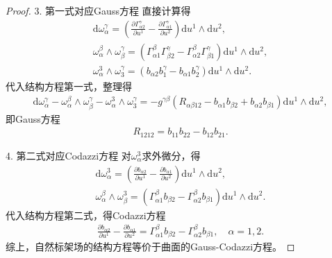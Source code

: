 \documentclass[../../main.tex]{subfiles}%
\begin{document}
\begin{proof}
3. 第一式对应Gauss方程
直接计算得
\begin{gather*}
\mathrm{d}\omega^\gamma_\alpha=\left(\frac{\partial\Gamma^\gamma_{\alpha2}}{\partial u^1}-\frac{\partial\Gamma^\gamma_{\alpha1}}{\partial u^2}\right)\mathrm{d}u^1\wedge\mathrm{d}u^2,\\
\omega^\beta_\alpha\wedge\omega^\gamma_\beta=\left(\Gamma^\beta_{\alpha1}\Gamma^\gamma_{\beta2}-\Gamma^\beta_{\alpha2}\Gamma^\gamma_{\beta1}\right)\mathrm{d}u^1\wedge\mathrm{d}u^2,\\
\omega^3_\alpha\wedge\omega^\gamma_3=(b_{\alpha2}b_1^\gamma-b_{\alpha1}b_2^\gamma)\mathrm{d}u^1\wedge\mathrm{d}u^2.
\end{gather*}
代入结构方程第一式，整理得
\begin{align*}
\mathrm{d}\omega^\gamma_\alpha-\omega^\beta_\alpha\wedge\omega^\gamma_\beta-\omega^3_\alpha\wedge\omega^\gamma_3=-g^{\gamma\beta}\left(R_{\alpha\beta12}-b_{\alpha1}b_{\beta2}+b_{\alpha2}b_{\beta1}\right)\mathrm{d}u^1\wedge\mathrm{d}u^2,
\end{align*}
即Gauss方程
\begin{align}
R_{1212}=b_{11}b_{22}-b_{12}b_{21}.
\label{eq:gauss-equation}
\end{align}

4. 第二式对应Codazzi方程
对$\omega^3_\alpha$求外微分，得
\begin{align*}
\mathrm{d}\omega^3_\alpha=\left(\frac{\partial b_{\alpha2}}{\partial u^1}-\frac{\partial b_{\alpha1}}{\partial u^2}\right)\mathrm{d}u^1\wedge\mathrm{d}u^2,\\
\omega^\beta_\alpha\wedge\omega^3_\beta=\left(\Gamma^\beta_{\alpha1}b_{\beta2}-\Gamma^\beta_{\alpha2}b_{\beta1}\right)\mathrm{d}u^1\wedge\mathrm{d}u^2.
\end{align*}
代入结构方程第二式，得Codazzi方程
\begin{align}
\frac{\partial b_{\alpha2}}{\partial u^1}-\frac{\partial b_{\alpha1}}{\partial u^2}=\Gamma^\beta_{\alpha1}b_{\beta2}-\Gamma^\beta_{\alpha2}b_{\beta1},\quad \alpha=1,2.
\label{eq:codazzi-equation}
\end{align}
综上，自然标架场的结构方程等价于曲面的Gauss-Codazzi方程。

\end{proof}
\end{document}
